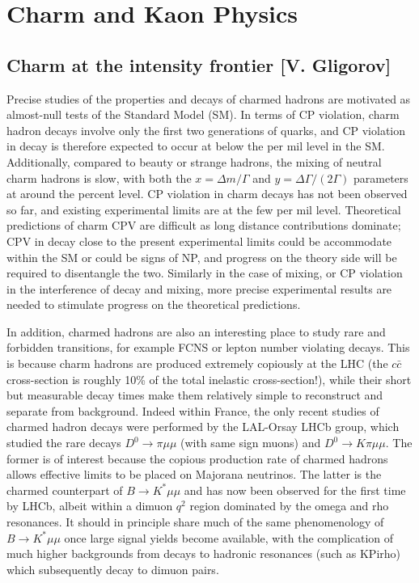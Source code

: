 \section{Charm and Kaon Physics}

\subsection{Charm at the intensity frontier [V. Gligorov]}

Precise studies of the properties and decays of charmed hadrons are motivated as almost-null tests of the Standard Model (SM). In terms of CP violation, charm hadron decays involve only the first two generations of quarks, and CP violation in decay is therefore expected to occur at below the per mil level in the SM. Additionally, compared to beauty or strange hadrons, the mixing of neutral charm hadrons is slow, with both the $x = \Delta m/\Gamma$ and $y = \Delta \Gamma/ (2\Gamma)$ parameters at around the percent level. CP violation in charm decays has not been observed so far, and existing experimental limits are at the few per mil level. Theoretical predictions of charm CPV are difficult as long distance contributions dominate; CPV in decay close to the present experimental limits could be accommodate within the SM or could be signs of NP, and progress on the theory side will be required to disentangle the two. Similarly in the case of mixing, or CP violation in the interference of decay and mixing, more precise experimental results are needed to stimulate progress on the theoretical predictions.

In addition, charmed hadrons are also an interesting place to study rare and forbidden transitions, for example FCNS or lepton number violating decays. This is because charm hadrons are produced extremely copiously at the LHC (the $c \bar{c}$ cross-section is roughly 10\% of the total inelastic cross-section!), while their short but measurable decay times make them relatively simple to reconstruct and separate from background. Indeed within France, the only recent studies of charmed hadron decays were performed by the LAL-Orsay LHCb group, which studied the rare decays $D^0 \to \pi \mu\mu$ (with same sign muons) and $D^0 \to K \pi\mu\mu$. The former is of interest because the copious production rate of charmed hadrons allows effective limits to be placed on Majorana neutrinos. The latter is the charmed counterpart of $B\to K^*\mu\mu$ and has now been observed for the first time by LHCb, albeit within a dimuon $q^2$ region dominated by the omega and rho resonances. It should in principle share much of the same phenomenology of $B\to K^*\mu\mu$ once large signal yields become available, with the complication of much higher backgrounds from decays to hadronic resonances (such as KPirho) which subsequently decay to dimuon pairs.

